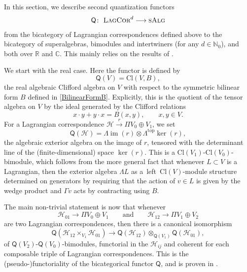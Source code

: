 \documentclass[10pt,a4paper]{amsart}
\numberwithin{equation}{section}
\DeclareMathOperator{\im}{\mathrm{im}}
\newcommand{\LagCor}{\textsc{LagCor}}
\newcommand{\R}{\mathbb{R}}
\newcommand{\N}{\mathbb{N}}
\newcommand{\C}{\mathbb{C}}
\newcommand{\Cl}{\mathrm{Cl}}
\begin{document}
In this section, we describe second quantization functors
\begin{equation*}
 \textsf{Q}\colon\ \LagCor^d \longrightarrow \textsc{sAlg}
\end{equation*}
from the bicategory of Lagrangian correspondences defined above to the bicategory of superalgebras, bimodules and intertwiners (for any $d \in \N_0$), and both over $\R$ and $\C$.
This mainly relies on the results of \cite[Section~2]{LudewigRoos}.

We start with the real case.
Here the functor is defined by
\[
 \textsf{Q}(V) = \Cl(V, B),\]
the real algebraic Clifford algebra on $V$ with respect to the symmetric bilinear form $B$ defined in \eqref{BilinearFormB}.
Explicitly, this is the quotient of the tensor algebra on $V$ by the ideal generated by the Clifford relations
\begin{equation*}
 x \cdot y + y \cdot x = B(x, y), \qquad x, y \in V.
\end{equation*}
For a Lagrangian correspondence $\mathcal{H} \stackrel{r}{\to} \Pi V_0 \oplus V_1$, we set
\begin{equation*}
 \textsf{Q}(\mathcal{H}) = \Lambda \im(r) \otimes \Lambda^{\mathrm{top}} \ker(r),
\end{equation*}
the algebraic exterior algebra on the image of $r$, tensored with the determinant line of the (finite-dimensional) space $\ker(r)$.
This is a $\Cl(V_1)$-$\Cl(V_0)$-bimodule, which follows from the more general fact that whenever $L \subset V$ is a Lagrangian, then the exterior algebra $\Lambda L$ as a~left~$\Cl(V)$-module structure determined on generators by requiring that the action of $v \in L$ is given by the wedge product and $\Gamma v$ acts by contracting using $B$.

The main non-trivial statement is now that whenever
\[\mathcal{H}_{01} \to \Pi V_0 \oplus V_1\qquad \text{and}\qquad \mathcal{H}_{12} \to \Pi V_1 \oplus V_2\]
 are two Lagrangian correspondences, then there is a canonical isomorphism
\begin{equation}
\label{CoherenceIsomorphism}
 \textsf{Q}(\mathcal{H}_{12} \times_{V_1} \mathcal{H}_{01}) \longrightarrow \textsf{Q}(\mathcal{H}_{12}) \otimes_{\mathsf{Q}(V_1)} \textsf{Q}(\mathcal{H}_{01}),
\end{equation}
of $\textsf{Q}(V_2)$-$\textsf{Q}(V_0)$-bimodules, functorial in the $\mathcal{H}_{ij}$ and coherent for each composable triple of Lagrangian correspondences.
This is the (pseudo-)functoriality of the bicategorical functor $\textsf{Q}$, and is proven in \cite[Theorems~2.15 and~3.22]{LudewigRoos}.
\end{document}
